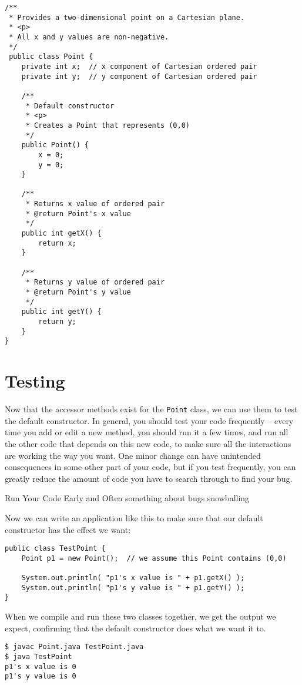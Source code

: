 \begin{verbatim}
/**
 * Provides a two-dimensional point on a Cartesian plane.
 * <p>
 * All x and y values are non-negative.
 */
 public class Point {
    private int x;  // x component of Cartesian ordered pair
    private int y;  // y component of Cartesian ordered pair

    /**
     * Default constructor
     * <p>
     * Creates a Point that represents (0,0)
     */
    public Point() {
        x = 0;
        y = 0;
    }

    /**
     * Returns x value of ordered pair
     * @return Point's x value
     */
    public int getX() {
        return x;
    }

    /**
     * Returns y value of ordered pair
     * @return Point's y value
     */
    public int getY() {
        return y;
    }
}
\end{verbatim}

\section{Testing}

Now that the accessor methods exist for the \texttt{Point} class, we can use them to test the default constructor.  In general, you should test your code frequently -- every time you add or edit a new method, you should run it a few times, and run all the other code that depends on this new code, to make sure all the interactions are working the way you want.  One minor change can have unintended consequences in some other part of your code, but if you test frequently, you can greatly reduce the amount of code you have to search through to find your bug.

\begin{tip}{Run Your Code Early and Often}
    something about bugs snowballing
\end{tip}

Now we can write an application like this to make sure that our default constructor has the effect we want:

\begin{verbatim}
public class TestPoint {
    Point p1 = new Point();  // we assume this Point contains (0,0)

    System.out.println( "p1's x value is " + p1.getX() );
    System.out.println( "p1's y value is " + p1.getY() );
}
\end{verbatim}

When we compile and run these two classes together, we get the output we expect, confirming that the default constructor does what we want it to.

\begin{verbatim}
$ javac Point.java TestPoint.java
$ java TestPoint
p1's x value is 0
p1's y value is 0
\end{verbatim}
